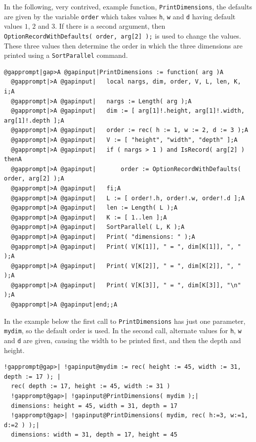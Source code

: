 \documentclass[a4paper,11pt]{report}
\begin{document}
{{{ In the following, very contrived, example function, \texttt{PrintDimensions}, the defaults are given by the variable \texttt{order} which takes values \texttt{h}, \texttt{w} and \texttt{d} having default values $1$, $2$ and $3$. If there is a second argument, then \texttt{OptionRecordWithDefaults( order, arg[2] );} is used to change the values. These three values then determine the order in
which the three dimensions are printed using a \texttt{SortParallel} command. 
\begin{Verbatim}[commandchars=@|A,fontsize=\small,frame=single,label=Example]
  @gapprompt|gap>A @gapinput|PrintDimensions := function( arg )A
  @gapprompt|>A @gapinput|   local nargs, dim, order, V, L, len, K, i;A
  @gapprompt|>A @gapinput|   nargs := Length( arg );A
  @gapprompt|>A @gapinput|   dim := [ arg[1]!.height, arg[1]!.width, arg[1]!.depth ];A
  @gapprompt|>A @gapinput|   order := rec( h := 1, w := 2, d := 3 );A
  @gapprompt|>A @gapinput|   V := [ "height", "width", "depth" ];A
  @gapprompt|>A @gapinput|   if ( nargs > 1 ) and IsRecord( arg[2] ) thenA
  @gapprompt|>A @gapinput|       order := OptionRecordWithDefaults( order, arg[2] );A
  @gapprompt|>A @gapinput|   fi;A
  @gapprompt|>A @gapinput|   L := [ order!.h, order!.w, order!.d ];A
  @gapprompt|>A @gapinput|   len := Length( L );A
  @gapprompt|>A @gapinput|   K := [ 1..len ];A
  @gapprompt|>A @gapinput|   SortParallel( L, K );A
  @gapprompt|>A @gapinput|   Print( "dimensions: " );A
  @gapprompt|>A @gapinput|   Print( V[K[1]], " = ", dim[K[1]], ", " );A
  @gapprompt|>A @gapinput|   Print( V[K[2]], " = ", dim[K[2]], ", " );A
  @gapprompt|>A @gapinput|   Print( V[K[3]], " = ", dim[K[3]], "\n" );A
  @gapprompt|>A @gapinput|end;;A
\end{Verbatim}
 In the example below the first call to \texttt{PrintDimensions} has just one parameter, \texttt{mydim}, so the default order is used. In the second call, alternate values for \texttt{h}, \texttt{w} and \texttt{d} are given, causing the width to be printed first, and then the depth and
height. 
\begin{Verbatim}[commandchars=!@|,fontsize=\small,frame=single,label=Example]
  !gapprompt@gap>| !gapinput@mydim := rec( height := 45, width := 31, depth := 17 ); |
  rec( depth := 17, height := 45, width := 31 )
  !gapprompt@gap>| !gapinput@PrintDimensions( mydim );|
  dimensions: height = 45, width = 31, depth = 17
  !gapprompt@gap>| !gapinput@PrintDimensions( mydim, rec( h:=3, w:=1, d:=2 ) );|
  dimensions: width = 31, depth = 17, height = 45
\end{Verbatim}
 }

 }

 }
\end{document}
